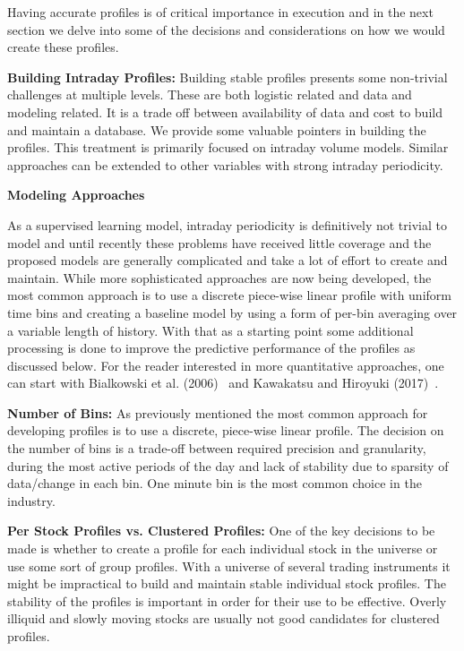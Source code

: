 Having accurate profiles is of critical importance in execution and in the next section we delve into some of the decisions and considerations on how we would create these profiles. \twomedskip


\noindent\textbf{Building Intraday Profiles:} Building stable profiles presents some non-trivial challenges at multiple levels. These are both logistic related and data and modeling related. It is a trade off between availability of data and cost to build and maintain a database. We provide some valuable pointers in building the profiles. This treatment is primarily focused on intraday volume models. Similar approaches can be extended to other variables with strong intraday periodicity. \twomedskip


\noindent\textbf{Modeling Approaches} \twomedskip

As a supervised learning model, intraday periodicity is definitively not trivial to model and until recently these problems have received little coverage and the proposed models are generally complicated and take a lot of effort to create and maintain. While more sophisticated approaches are now being developed, the most common approach is to use a discrete piece-wise linear profile with uniform time bins and creating a baseline model by using a form of per-bin averaging over a variable length of history. With that as a starting point some additional processing is done to improve the predictive performance of the profiles as discussed below. For the reader interested in more quantitative approaches, one can start with Bialkowski et al. (2006)~\cite{bidafol} and Kawakatsu and Hiroyuki (2017)~\cite{kawhiro}. \twomedskip


\noindent\textbf{Number of Bins:} As previously mentioned the most common approach for developing profiles is to use a discrete, piece-wise linear profile. The decision on the number of bins is a trade-off between required precision and granularity, during the most active periods of the day and lack of stability due to sparsity of data/change in each bin. One minute bin is the most common choice in the industry. \twomedskip


\noindent\textbf{Per Stock Profiles vs. Clustered Profiles:} One of the key decisions to be made is whether to create a profile for each individual stock in the universe or use some sort of group profiles. With a universe of several trading instruments it might be impractical to build and maintain stable individual stock profiles. The stability of the profiles is important in order for their use to be effective. Overly illiquid and slowly moving stocks are usually not good candidates for clustered profiles. 



